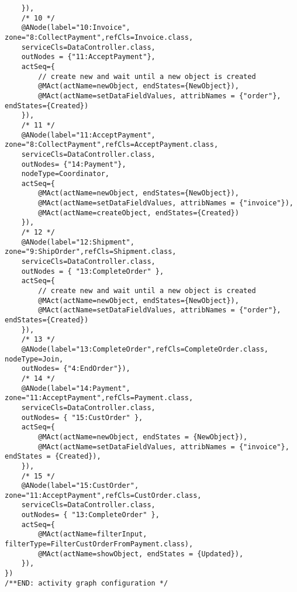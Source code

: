 \begin{verbatim}
	}),
	/* 10 */    
	@ANode(label="10:Invoice", zone="8:CollectPayment",refCls=Invoice.class,
	serviceCls=DataController.class, 
	outNodes = {"11:AcceptPayment"},
	actSeq={
		// create new and wait until a new object is created
		@MAct(actName=newObject, endStates={NewObject}),
		@MAct(actName=setDataFieldValues, attribNames = {"order"}, endStates={Created})
	}),
	/* 11 */    
	@ANode(label="11:AcceptPayment", zone="8:CollectPayment",refCls=AcceptPayment.class,
	serviceCls=DataController.class,
	outNodes= {"14:Payment"},
	nodeType=Coordinator,      
	actSeq={
		@MAct(actName=newObject, endStates={NewObject}),
		@MAct(actName=setDataFieldValues, attribNames = {"invoice"}),
		@MAct(actName=createObject, endStates={Created})
	}),
	/* 12 */    
	@ANode(label="12:Shipment", zone="9:ShipOrder",refCls=Shipment.class,
	serviceCls=DataController.class,
	outNodes = { "13:CompleteOrder" },
	actSeq={
		// create new and wait until a new object is created
		@MAct(actName=newObject, endStates={NewObject}),
		@MAct(actName=setDataFieldValues, attribNames = {"order"}, endStates={Created})
	}),
	/* 13 */    
	@ANode(label="13:CompleteOrder",refCls=CompleteOrder.class, nodeType=Join, 
	outNodes= {"4:EndOrder"}),
	/* 14 */    
	@ANode(label="14:Payment", zone="11:AcceptPayment",refCls=Payment.class,
	serviceCls=DataController.class, 
	outNodes= { "15:CustOrder" },
	actSeq={
		@MAct(actName=newObject, endStates = {NewObject}),
		@MAct(actName=setDataFieldValues, attribNames = {"invoice"}, endStates = {Created}),
	}),
	/* 15 */    
	@ANode(label="15:CustOrder", zone="11:AcceptPayment",refCls=CustOrder.class,
	serviceCls=DataController.class,
	outNodes= { "13:CompleteOrder" },
	actSeq={
		@MAct(actName=filterInput, filterType=FilterCustOrderFromPayment.class),
		@MAct(actName=showObject, endStates = {Updated}),
	}),
})
/**END: activity graph configuration */
\end{verbatim}